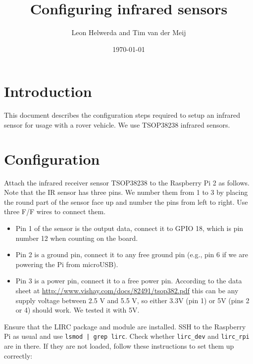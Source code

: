 \documentclass{article}
\begin{document}
\title{Configuring infrared sensors}
\author{Leon Helwerda and Tim van der Meij}
\date{\today}

\maketitle

\section{Introduction}
This document describes the configuration steps required to setup an infrared 
sensor for usage with a rover vehicle. We use TSOP38238 infrared sensors.

\section{Configuration}
Attach the infrared receiver sensor TSOP38238 to the Raspberry Pi 2 as follows. 
Note that the IR sensor has three pins. We number them from 1 to 3 by placing 
the round part of the sensor face up and number the pins from left to right. 
Use three F/F wires to connect them.

\begin{itemize}
    \item Pin 1 of the sensor is the output data, connect it to GPIO 18, which 
          is pin number 12 when counting on the board.
    \item Pin 2 is a ground pin, connect it to any free ground pin (e.g., pin 6 
          if we are powering the Pi from microUSB).
    \item Pin 3 is a power pin, connect it to a free power pin. According to 
          the data sheet at \url{http://www.vishay.com/docs/82491/tsop382.pdf} 
          this can be any supply voltage between 2.5 V and 5.5 V, so either 
          3.3V (pin 1) or 5V (pins 2 or 4) should work. We tested it with 5V.
\end{itemize}

Ensure that the LIRC package and module are installed. SSH to the Raspberry Pi 
as usual and use {\tt lsmod | grep lirc}. Check whether {\tt lirc\_dev} and 
{\tt lirc\_rpi} are in there. If they are not loaded, follow these instructions 
to set them up correctly:
\end{document}
